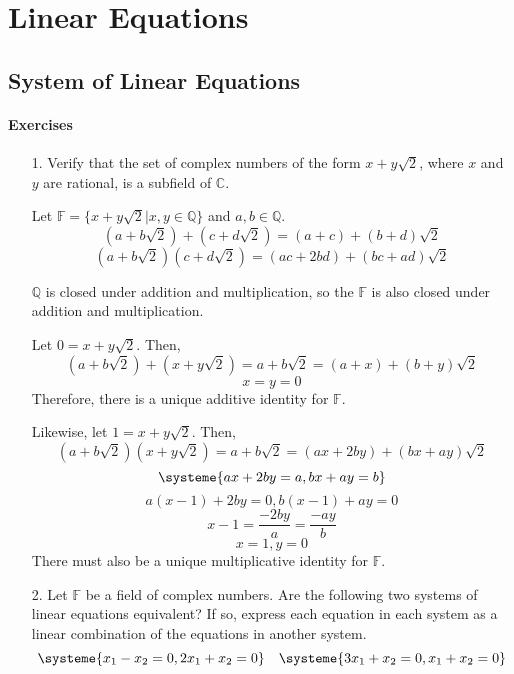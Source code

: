 \documentclass{article}
\begin{document}
\section{Linear Equations}

\setcounter{subsection}{1}
\subsection{System of Linear Equations}

\paragraph{Exercises}
\begin{enumerate}[listparindent=\parindent]
\item[1.] Verify that the set of complex numbers of the form \(x + y\sqrt{2}\), where \(x\) and \(y\) are rational, is a subfield of \(\mathbb{C}\).

    Let \(\mathbb F = \{x + y\sqrt{2} | x, y \in \mathbb Q\}\) and \(a, b \in \mathbb Q\).
    \[(a + b\sqrt{2}) + (c + d\sqrt{2}) = (a + c) + (b + d)\sqrt{2}\]
    \[(a + b\sqrt{2})(c + d\sqrt{2}) = (ac + 2bd) + (bc + ad)\sqrt{2}\]

    \(\mathbb Q\) is closed under addition and multiplication, so the \(\mathbb F\) is also closed under addition and multiplication.

    Let \(0 = x + y\sqrt{2}\). Then,
    \[(a + b\sqrt{2}) + (x + y\sqrt{2}) = a + b\sqrt{2} = (a + x) + (b + y)\sqrt{2}\]
    \[x = y = 0\]
    Therefore, there is a unique additive identity for \(\mathbb F\).

    Likewise, let \(1 = x + y\sqrt{2}\). Then,
    \[(a + b\sqrt{2})(x + y\sqrt{2}) = a + b\sqrt{2} = (ax + 2by) + (bx + ay)\sqrt{2}\]
    \[
        \systeme{
            ax + 2by = a,
            bx + ay = b
        }
    \]
    \[a(x - 1) + 2by = 0, b(x - 1) + ay = 0\]
    \[x - 1 = \frac{-2by}{a} = \frac{-ay}{b}\]
    \[x = 1, y = 0\]
    There must also be a unique multiplicative identity for \(\mathbb F\).

\item[2.] Let \(\mathbb F\) be a field of complex numbers. Are the following two systems of linear equations equivalent?
    If so, express each equation in each system as a linear combination of the equations in another system.
    \[
        \systeme{
            x_1 - x_2 = 0,
            2x_1 + x_2 = 0
        }
        \quad
        \systeme{
            3x_1 + x_2 = 0,
            x_1 + x_2 = 0
        }
    \]


\end{enumerate}
\end{document}

